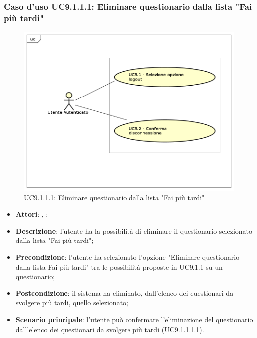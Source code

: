 				\subsubsection{Caso d'uso UC9.1.1.1: Eliminare questionario dalla lista "Fai più tardi"}
				\label{UC9.1.4.1}
				\begin{figure}[h]
					\centering
					\includegraphics[scale=0.7,keepaspectratio]{UML/UC9.png}
					\caption{UC9.1.1.1: Eliminare questionario dalla lista "Fai più tardi"}
				\end{figure}
				\FloatBarrier
				\begin{itemize}
					\item \textbf{Attori}: \uau, \uaupro;
					\item \textbf{Descrizione}: l'utente ha la possibilità di eliminare il questionario selezionato dalla lista "Fai più tardi";
					\item \textbf{Precondizione}: l'utente ha selezionato l'opzione "Eliminare questionario dalla lista Fai più tardi" tra le possibilità proposte in UC9.1.1 su un questionario;
					\item \textbf{Postcondizione}: il sistema ha eliminato, dall'elenco dei questionari da svolgere più tardi, quello selezionato;
					\item \textbf{Scenario principale}: l'utente può confermare l'eliminazione del questionario dall'elenco dei questionari da svolgere più tardi (UC9.1.1.1.1).	
				\end{itemize}
				
